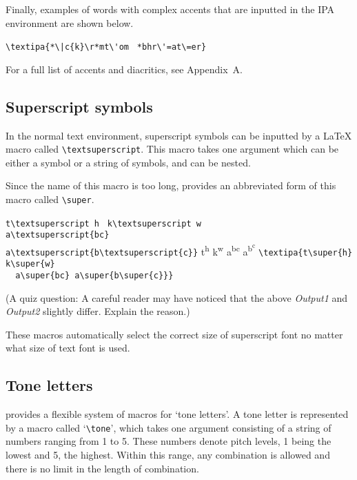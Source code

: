 Finally, examples of words with complex accents that are inputted in the
IPA environment are shown below.

\begin{tipaexample}
  \yitem \verb+\textipa{*\|c{k}\r*mt\'om +
    \verb+*bhr\'=at\=er}+
  \yitem {}
\end{tipaexample}

For a full list of accents and diacritics, see Appendix~A.

\subsection{Superscript symbols}

In the normal text environment, superscript symbols can be inputted by a
\LaTeX{} macro called \verb|\textsuperscript|.  This macro takes one
argument which can be either a symbol or a string of symbols, and can
be nested.

Since the name of this macro is too long, \tipa{} provides an
abbreviated form of this macro called \verb|\super|.

\begin{tipaexample}
  \xitem
    \verb|t\textsuperscript h |
    \verb|k\textsuperscript w|\\
    \verb|a\textsuperscript{bc}|\\
    \verb|a\textsuperscript{b\textsuperscript{c}}|
  \xitem
    t\textsuperscript h k\textsuperscript w a\textsuperscript{bc} 
      a\textsuperscript{b\textsuperscript{c}}
  \xitem
    \verb|\textipa{t\super{h} k\super{w}|\\
    \verb|  a\super{bc} a\super{b\super{c}}}|
  \xitem
\end{tipaexample}

\noindent
(A quiz question: A careful reader may have noticed that the above
\textit{Output1} and \textit{Output2} slightly differ. Explain the
reason.)

\medskip

These macros automatically select the correct size of superscript font 
no matter what size of text font is used.

\subsection{Tone letters}\label{sec:tone}

\tipa{} provides a flexible system of macros for `tone letters'. A
tone letter is represented by a macro called `\verb|\tone|', which
takes one argument consisting of a string of numbers ranging from 1 to
5. These numbers denote pitch levels, 1 being the lowest and 5, the
highest. Within this range, any combination is allowed and there is no
limit in the length of combination.

